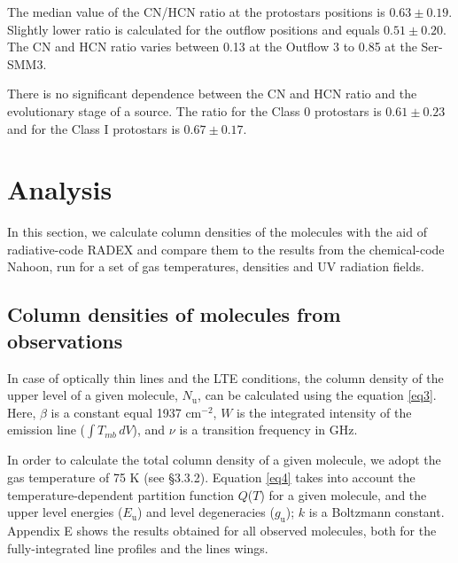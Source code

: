 \documentclass{aa}
\begin{document}
The median value of the CN/HCN ratio at the protostars positions is $0.63 \pm 0.19$. Slightly lower
ratio is calculated for the outflow positions and equals $0.51 \pm 0.20$.
The CN and HCN ratio varies between 0.13 at the Outflow 3 to 0.85 at the Ser-SMM3. 

There is no significant dependence between the CN and HCN ratio and the evolutionary stage of a source. The ratio for the
Class 0 protostars is $0.61 \pm 0.23$ and for the Class I protostars is $0.67 \pm 0.17$.

\section{Analysis}
In this section, we calculate column densities of the molecules with the aid 
of radiative-code RADEX and compare them to the results from the chemical-code Nahoon, 
run for a set of gas temperatures, densities and UV radiation fields. 
\subsection{Column densities of molecules from observations}

In case of optically thin lines and the LTE conditions, the column density of the 
upper level of a given molecule, $N_\mathrm{u}$, can be calculated using the equation \ref{eq3}. 
Here, $\beta$ is a constant equal 1937 cm$^{-2}$, $W$ is the integrated
intensity of the emission line ($\int{T_{mb} \, dV}$), and $\nu$ is a transition 
frequency in GHz. 

In order to calculate the total column density of a given molecule, 
we adopt the gas temperature of 75 K (see \S 3.3.2). Equation \ref{eq4} takes into account the 
temperature-dependent partition function $Q$($T$) for a given molecule, and 
the upper level energies ($E_\mathrm{u}$) and level degeneracies ($g_\mathrm{u}$);
$k$ is a Boltzmann constant. Appendix E shows the results obtained for all observed 
molecules, both for the fully-integrated line profiles and the lines wings.
\end{document}

